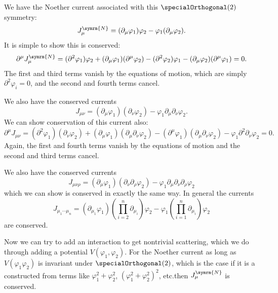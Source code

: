 \documentclass[fleqn]{NotesClass}
\newcommand{\dalembertian}{\partial^2}
\begin{document}
    We have the Noether current associated with this \(\specialOrthogonal(2)\) symmetry:
    \begin{equation}
        J_\mu^{\symrm{N}} = (\partial_\mu \varphi_1) \varphi_2 - \varphi_1(\partial_\mu \varphi_2).
    \end{equation}
    It is simple to show this is conserved:
    \begin{equation}
        \partial^\mu J_\mu^{\symrm{N}} = (\dalembertian \varphi_1)\varphi_2 + (\partial_\mu \varphi_1)(\partial^\mu \varphi_2) - (\dalembertian \varphi_2)\varphi_1 - (\partial_\mu \varphi_2)(\partial^\mu \varphi_1) = 0.
    \end{equation}
    The first and third terms vanish by the equations of motion, which are simply \(\dalembertian \varphi_i = 0\), and the second and fourth terms cancel.
    
    We also have the conserved currents
    \begin{equation}
        J_{\mu\nu} = (\partial_\mu \varphi_1)(\partial_\nu \varphi_2) - \varphi_1 \partial_\mu \partial_\nu \varphi_2.
    \end{equation}
    We can show conservation of this current also:
    \begin{equation}
        \partial^\mu J_{\mu\nu} = (\dalembertian \varphi_1)(\partial_\nu \varphi_2) + (\partial_\mu \varphi_1)(\partial_\mu \partial_\nu \varphi_2) - (\partial^\mu \varphi_1)(\partial_\mu \partial_\nu \varphi_2) - \varphi_1 \dalembertian \partial_\nu \varphi_2 = 0.
    \end{equation}
    Again, the first and fourth terms vanish by the equations of motion and the second and third terms cancel.
    
    We also have the conserved currents
    \begin{equation}
        J_{\mu\nu\rho} = (\partial_\mu \varphi_1) (\partial_\nu \partial_\rho \varphi_2) - \varphi_1 \partial_\mu \partial_\nu \partial_\rho \varphi_2
    \end{equation}
    which we can show is conserved in exactly the same way.
    In general the currents
    \begin{equation}
        J_{\mu_1 \dotsm \mu_n} = (\partial_{\mu_1} \varphi_1) \left( \prod_{i=2}^{n} \partial_{\mu_i} \right) \varphi_2 - \varphi_1 \left( \prod_{i=1}^{n} \partial_{\mu_i} \right) \varphi_2
    \end{equation}
    are conserved.
    
    Now we can try to add an interaction to get nontrivial scattering, which we do through adding a potential \(V(\varphi_1, \varphi_2)\).
    For the Noether current as long as \(V(\varphi_1 \varphi_2)\) is invariant under \(\specialOrthogonal(2)\), which is the case if it is a constructed from terms like \(\varphi_1^2 + \varphi_2^2\), \((\varphi_1^2 + \varphi_2^2)^2\), etc.\@ then \(J_\mu^{\symrm{N}}\) is conserved.
    
\end{document}
